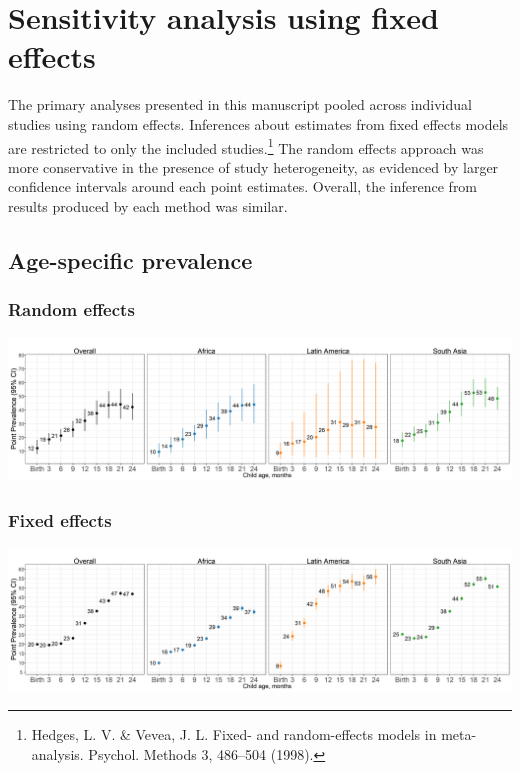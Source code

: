 \documentclass[9pt,]{book}
\let\rmarkdownfootnote\footnote%
\def\footnote{\protect\rmarkdownfootnote}
\begin{document}
\hypertarget{fixed-effects}{%
\chapter{Sensitivity analysis using fixed effects}\label{fixed-effects}}

The primary analyses presented in this manuscript pooled across individual studies using random effects. Inferences about estimates from fixed effects models are restricted to only the included studies.\footnote{Hedges, L. V. \& Vevea, J. L. Fixed- and random-effects models in meta-analysis. Psychol. Methods 3, 486--504 (1998).} The random effects approach was more conservative in the presence of study heterogeneity, as evidenced by larger confidence intervals around each point estimates. Overall, the inference from results produced by each method was similar.

\hypertarget{age-specific-prevalence-2}{%
\section{Age-specific prevalence}\label{age-specific-prevalence-2}}

\hypertarget{random-effects}{%
\subsection{Random effects}\label{random-effects}}

\includegraphics[width=58.33in]{figure-copies/fig-stunt-2-prev-overall_region--allage-primary}

\hypertarget{fixed-effects-1}{%
\subsection{Fixed effects}\label{fixed-effects-1}}

\includegraphics[width=58.33in]{figure-copies/fig-stunt-2-prev-overall_region--allage-fe}
\end{document}
